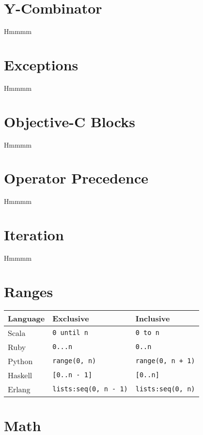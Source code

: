 \documentclass{article}
\begin{document}
\section{Y-Combinator}
Hmmmm

\section{Exceptions}
Hmmmm

\section{Objective-C Blocks}
Hmmmm

\section{Operator Precedence}
Hmmmm

\section{Iteration}
Hmmmm

\section{Ranges}
\begin{longtabu} to 0.75\linewidth { X X X }
	Language & Exclusive & Inclusive \\
	\hline
	Scala & \lstinline$0 until n$ & \lstinline$0 to n$ \\
	Ruby & \lstinline$0...n$ & \lstinline$0..n$ \\
	Python & \lstinline$range(0, n)$ & \lstinline$range(0, n + 1)$ \\
	Haskell & \lstinline$[0..n - 1]$ & \lstinline$[0..n]$ \\
	Erlang & \lstinline$lists:seq(0, n - 1)$ & \lstinline$lists:seq(0, n)$ \\
\end{longtabu}

\section{Math}
\end{document}
